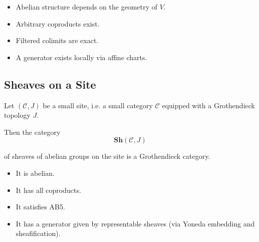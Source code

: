 \begin{itemize}
    \item Abelian structure depends on the geometry of $V$.
    \item Arbitrary coproducts exist.
    \item Filtered colimits are exact.
    \item A generator exists locally via affine charts.
\end{itemize}

\subsection{Sheaves on a Site}

Let $(\mathcal{C}, J)$ be a small site, i.e. a small category $\mathcal{C}$ equipped with a Grothendieck topology $J$.

Then the category
\[
\mathbf{Sh}(\mathcal{C}, J)
\]

of sheaves of abelian groups on the site is a Grothendieck category.

\begin{itemize}
    \item It is abelian.
    \item It has all coproducts.
    \item It satisfies AB5.
    \item It has a generator given by representable sheaves (via Yoneda embedding and sheafification).
\end{itemize}